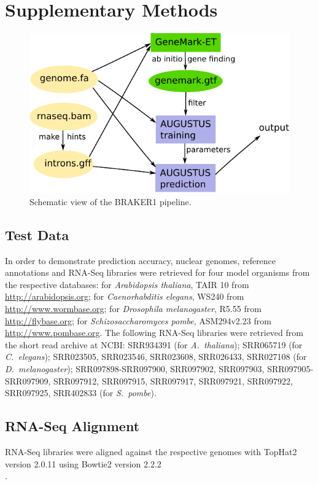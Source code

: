 \documentclass[a4paper,10pt]{report}
\begin{document}
\chapter{Supplementary Methods}

\begin{figure}[!h]%
\centerline{\includegraphics[width=0.7\linewidth]{figs/Figure1.pdf}}
\caption{Schematic view of the BRAKER1 pipeline.}\label{pipeline}
\end{figure}

\section{Test Data}

In order to demonstrate prediction accuracy, nuclear genomes, reference annotations and RNA-Seq libraries were retrieved for four model organisms from the respective databases: for \textit{Arabidopsis thaliana}, TAIR 10 from \url{http://arabidopsis.org}; for \textit{Caenorhabditis elegans}, WS240 from \url{http://www.wormbase.org}; for \textit{Drosophila melanogaster}, R5.55 from \url{http://flybase.org}; for \textit{Schizosaccharomyces pombe}, ASM294v2.23 from \url{http://www.pombase.org}. The following RNA-Seq libraries were retrieved from the short read archive at NCBI: SRR934391 (for \textit{A.~thaliana}); SRR065719 (for \textit{C.~elegans}); SRR023505, SRR023546, SRR023608, SRR026433, SRR027108 (for \textit{D.~melanogaster}); SRR097898-SRR097900, SRR097902, SRR097903,
SRR097905-SRR097909, SRR097912, SRR097915, SRR097917, SRR097921, SRR097922, SRR097925, SRR402833 (for \textit{S.~pombe}).

\section{RNA-Seq Alignment}

RNA-Seq libraries were aligned against the respective genomes with TopHat2 version 2.0.11 \cite{TopHat2} using Bowtie2 version 2.2.2\\ \cite{Bowtie2}.
\end{document}
